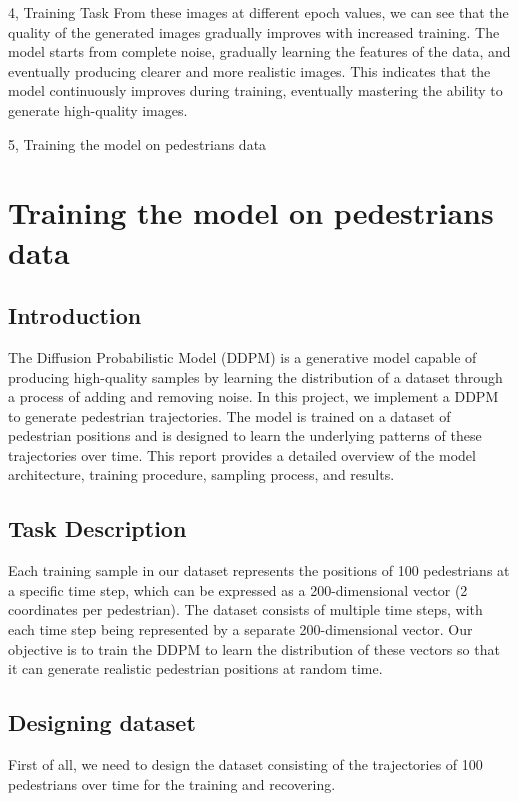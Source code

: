 \documentclass[10pt,a4paper]{article}
\begin{document}
\begin{task}{4, Training Task}
From these images at different epoch values, we can see that the quality of the generated images gradually improves with increased training. The model starts from complete noise, gradually learning the features of the data, and eventually producing clearer and more realistic images. This indicates that the model continuously improves during training, eventually mastering the ability to generate high-quality images.

\end{task}



\newpage
\begin{task}{5, Training the model on pedestrians data}
\section{Training the model on pedestrians data}
\subsection{Introduction}
The Diffusion Probabilistic Model (DDPM) is a generative model capable of producing high-quality samples by learning the distribution of a dataset through a process of adding and removing noise. In this project, we implement a DDPM to generate pedestrian trajectories. The model is trained on a dataset of pedestrian positions and is designed to learn the underlying patterns of these trajectories over time. This report provides a detailed overview of the model architecture, training procedure, sampling process, and results.
\subsection{Task Description}
Each training sample in our dataset represents the positions of 100 pedestrians at a specific time step, which can be expressed as a 200-dimensional vector (2 coordinates per pedestrian). The dataset consists of multiple time steps, with each time step being represented by a separate 200-dimensional vector. Our objective is to train the DDPM to learn the distribution of these vectors so that it can generate realistic pedestrian positions at random time.
\subsection{Designing dataset}
First of all, we need to design the dataset consisting of the trajectories of 100 pedestrians over time for the training and recovering. 

\end{task}
\end{document}
